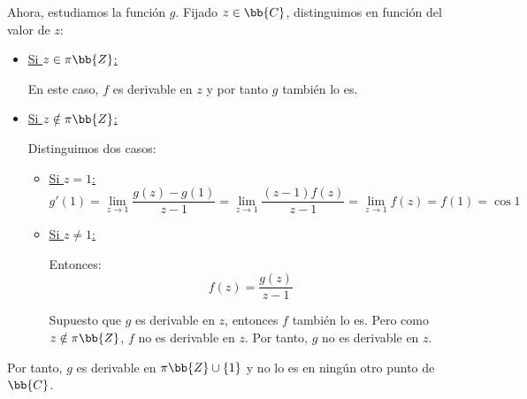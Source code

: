 \documentclass[12pt]{article}
\begin{document}
\begin{ejercicio}[3.5 puntos]
        Ahora, estudiamos la función $g$. Fijado $z\in \bb{C}$, distinguimos en función del valor de $z$:
        \begin{itemize}
            \item \ul{Si $z\in \pi\bb{Z}$:} 
            
            En este caso, $f$ es derivable en $z$ y por tanto $g$ también lo es.
            
            \item \ul{Si $z\notin \pi\bb{Z}$:}
            
            Distinguimos dos casos:
            \begin{itemize}
                \item \ul{Si $z=1$:} 
                \begin{equation*}
                    g'(1) = \lim_{z\to 1} \frac{g(z) - g(1)}{z - 1} = \lim_{z\to 1} \frac{(z-1)f(z)}{z-1} = \lim_{z\to 1} f(z)
                    = f(1) = \cos 1
                \end{equation*}

                \item \ul{Si $z\neq 1$:}
                
                Entonces:
                \begin{equation*}
                    f(z) = \dfrac{g(z)}{z-1}
                \end{equation*}

                Supuesto que $g$ es derivable en $z$, entonces $f$ también lo es. Pero como $z\notin \pi\bb{Z}$, $f$ no es derivable en $z$. Por tanto, $g$ no es derivable en $z$.
            \end{itemize}
        \end{itemize}

        Por tanto, $g$ es derivable en $\pi\bb{Z}\cup \{1\}$ y no lo es en ningún otro punto de $\bb{C}$.
    \end{ejercicio}
\end{document}
